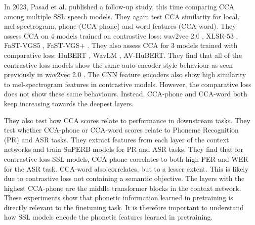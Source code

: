 In 2023, Pasad et al. \cite{pasad2023comparative} published a follow-up study, this time comparing CCA among multiple SSL speech models. They again test CCA similarity for local, mel-spectrogram, phone (CCA-phone) and word features (CCA-word). They assess CCA on 4 models trained on contrastive loss: wav2vec 2.0 \cite{wav2vec}, XLSR-53 \cite{XLSR-53}, FaST-VGS5 \cite{fastvgspeng2022}, FaST-VGS+ \cite{peng2022self}. They also assess CCA for 3 models trained with comparative loss: HuBERT \cite{hsu2021hubert}, WavLM \cite{chen2022wavlm}, AV-HuBERT\cite{shi2022learning}. They find that all of the contrastive loss models show the same auto-encoder style behaviour as seen previously in wav2vec 2.0 \cite{pasad2021layer}. The CNN feature encoders also show high similarity to mel-spectrogram features in contrastive models. However, the comparative loss does not show these same behaviours. Instead, CCA-phone and CCA-word both keep increasing towards the deepest layers.

They also test how CCA scores relate to performance in downstream tasks. They test whether CCA-phone or CCA-word scores relate to Phoneme Recognition (PR) and ASR tasks. They extract features from each layer of the context networks and train SuPERB models \cite{yang2021superb} for PR and ASR tasks. They find that for contrastive loss SSL models, CCA-phone correlates to both high PER and WER for the ASR task. CCA-word also correlates, but to a lesser extent. This is likely due to contrastive loss not containing a semantic objective. The layers with the highest CCA-phone are the middle transformer blocks in the context network. These experiments show that phonetic information learned in pretraining is directly relevant to the finetuning task. It is therefore important to understand how SSL models encode the phonetic features learned in pretraining.

